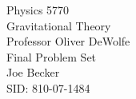 \begin{titlepage}
\setlength{\topmargin}{1.5in}
\begin{center}
\Huge{Physics 5770} \\
\LARGE{Gravitational Theory} \\
\Large{Professor Oliver DeWolfe} \\[1cm]

\huge{Final Problem Set}\\[0.5cm]

\large{Joe Becker} \\
\large{SID: 810-07-1484} \\
\large{\due} 

\end{center}

\end{titlepage}

